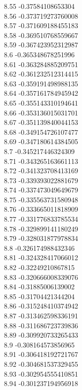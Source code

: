 {8.55	-0.37584108653304\\
8.56	-0.373719273760008\\
8.57	-0.371609188455183\\
8.58	-0.369510768559667\\
8.59	-0.367423952312987\\
8.6	-0.365348678251996\\
8.61	-0.363284885209751\\
8.62	-0.361232512314415\\
8.63	-0.359191498988135\\
8.64	-0.357161784945942\\
8.65	-0.355143310194641\\
8.66	-0.353136015031701\\
8.67	-0.351139840044153\\
8.68	-0.349154726107477\\
8.69	-0.347180614384505\\
8.7	-0.345217446324309\\
8.71	-0.343265163661113\\
8.72	-0.341323708413169\\
8.73	-0.339393022881679\\
8.74	-0.337473049649679\\
8.75	-0.335563731580948\\
8.76	-0.333665011818909\\
8.77	-0.331776833785534\\
8.78	-0.329899141180249\\
8.79	-0.328031877978834\\
8.8	-0.326174988432346\\
8.81	-0.324328417066012\\
8.82	-0.32249210867815\\
8.83	-0.320666008339076\\
8.84	-0.31885006139002\\
8.85	-0.31704421344204\\
8.86	-0.315248410374942\\
8.87	-0.313462598336191\\
8.88	-0.311686723739836\\
8.89	-0.309920733265433\\
8.9	-0.308164573856965\\
8.91	-0.306418192721767\\
8.92	-0.304681537329455\\
8.93	-0.302954555410851\\
8.94	-0.301237194956918\\
}
